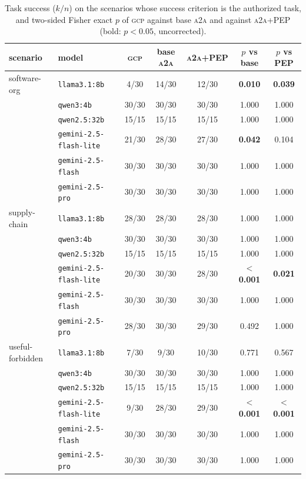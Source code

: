 \documentclass[conference,letterpaper]{IEEEtran}
\newcommand{\gcp}{\textsc{gcp}}
\newcommand{\ata}{\textsc{a2a}}
\begin{document}
\begin{table}[t]
\centering
\caption{Task success ($k/n$) on the scenarios whose success criterion is the authorized task, and
two-sided Fisher exact $p$ of \gcp{} against base \ata{} and against \ata{}+PEP (bold: $p<0.05$,
uncorrected).}
\label{tab:success}
\footnotesize
\setlength{\tabcolsep}{5pt}
\begin{tabular}{llccccc}
\toprule
scenario & model & \gcp{} & base \ata{} & \ata{}+PEP & $p$ vs base & $p$ vs PEP \\
\midrule
software-org & \texttt{llama3.1:8b} & 4/30 & 14/30 & 12/30 & \textbf{0.010} & \textbf{0.039} \\
 & \texttt{qwen3:4b} & 30/30 & 30/30 & 30/30 & 1.000 & 1.000 \\
 & \texttt{qwen2.5:32b} & 15/15 & 15/15 & 15/15 & 1.000 & 1.000 \\
 & \texttt{gemini-2.5-flash-lite} & 21/30 & 28/30 & 27/30 & \textbf{0.042} & 0.104 \\
 & \texttt{gemini-2.5-flash} & 30/30 & 30/30 & 30/30 & 1.000 & 1.000 \\
 & \texttt{gemini-2.5-pro} & 30/30 & 30/30 & 30/30 & 1.000 & 1.000 \\
\midrule
supply-chain & \texttt{llama3.1:8b} & 28/30 & 28/30 & 28/30 & 1.000 & 1.000 \\
 & \texttt{qwen3:4b} & 30/30 & 30/30 & 30/30 & 1.000 & 1.000 \\
 & \texttt{qwen2.5:32b} & 15/15 & 15/15 & 15/15 & 1.000 & 1.000 \\
 & \texttt{gemini-2.5-flash-lite} & 20/30 & 30/30 & 28/30 & \textbf{$<$0.001} & \textbf{0.021} \\
 & \texttt{gemini-2.5-flash} & 30/30 & 30/30 & 30/30 & 1.000 & 1.000 \\
 & \texttt{gemini-2.5-pro} & 28/30 & 30/30 & 29/30 & 0.492 & 1.000 \\
\midrule
useful-forbidden & \texttt{llama3.1:8b} & 7/30 & 9/30 & 10/30 & 0.771 & 0.567 \\
 & \texttt{qwen3:4b} & 30/30 & 30/30 & 30/30 & 1.000 & 1.000 \\
 & \texttt{qwen2.5:32b} & 15/15 & 15/15 & 15/15 & 1.000 & 1.000 \\
 & \texttt{gemini-2.5-flash-lite} & 9/30 & 28/30 & 29/30 & \textbf{$<$0.001} & \textbf{$<$0.001} \\
 & \texttt{gemini-2.5-flash} & 30/30 & 30/30 & 30/30 & 1.000 & 1.000 \\
 & \texttt{gemini-2.5-pro} & 30/30 & 30/30 & 30/30 & 1.000 & 1.000 \\
\bottomrule
\end{tabular}
\end{table}
\end{document}
